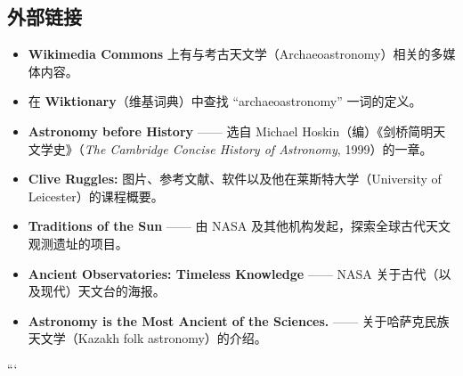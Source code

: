 \subsection{外部链接}
\begin{itemize}
    \item \textbf{Wikimedia Commons} 上有与考古天文学（Archaeoastronomy）相关的多媒体内容。
    \item 在 \textbf{Wiktionary}（维基词典）中查找 “archaeoastronomy” 一词的定义。
    \item \textbf{Astronomy before History} —— 选自 Michael Hoskin（编）《剑桥简明天文学史》（\textit{The Cambridge Concise History of Astronomy}, 1999）的一章。
    \item \textbf{Clive Ruggles:} 图片、参考文献、软件以及他在莱斯特大学（University of Leicester）的课程概要。
    \item \textbf{Traditions of the Sun} —— 由 NASA 及其他机构发起，探索全球古代天文观测遗址的项目。
    \item \textbf{Ancient Observatories: Timeless Knowledge} —— NASA 关于古代（以及现代）天文台的海报。
    \item \textbf{Astronomy is the Most Ancient of the Sciences.} —— 关于哈萨克民族天文学（Kazakh folk astronomy）的介绍。
\end{itemize}
```







